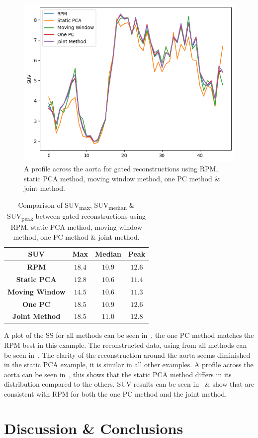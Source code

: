     \begin{figure}
        \centering
        \includegraphics[width=0.5\linewidth]{figures/profile_pca.png}
        \captionsetup{singlelinecheck=false, justification=centering}
        \caption{A profile across the aorta for gated reconstructions using \gls{RPM}, static \gls{PCA} method, moving window method, one \gls{PC} method \& joint method.}
        \label{fig:profile}
    \end{figure}
    
    \begin{table}
        \centering
        \captionsetup{singlelinecheck=false, justification=centering}
        \caption{Comparison of \gls{SUV}\textsubscript{max}, \gls{SUV}\textsubscript{median} \& \gls{SUV}\textsubscript{peak} between gated reconstructions using \gls{RPM}, static \gls{PCA} method, moving window method, one \gls{PC} method \& joint method.}
        
        \resizebox*{0.5\linewidth}{!}
        {
            \begin{tabular}{||c|ccc||}
                \hline
                \textbf{\gls{SUV}} & \textbf{Max} & \textbf{Median} & \textbf{Peak} \\
                \hline
                \textbf{\gls{RPM}}          & $18.4$ & $10.9$ & $12.6$ \\
                \hline
                \textbf{Static \gls{PCA}}   & $12.8$ & $10.6$ & $11.4$ \\
                \textbf{Moving Window}      & $14.5$ & $10.6$ & $11.3$ \\
                \textbf{One \gls{PC}}       & $18.5$ & $10.9$ & $12.6$ \\
                \textbf{Joint Method}       & $18.5$ & $11.0$ & $12.8$ \\
                \hline
            \end{tabular}
        }
        \label{tab:suv}
    \end{table}
    
    A plot of the \gls{SS} for all methods can be seen in~, the one \gls{PC} method matches the \gls{RPM} best in this example. The reconstructed data, using  from all methods can be seen in~. The clarity of the reconstruction around the aorta seems diminished in the static \gls{PCA} example, it is similar in all other examples. A profile across the aorta can be seen in~, this shows that the static \gls{PCA} method differs in its distribution compared to the others. \gls{SUV} results can be seen in~ \& show that  are consistent with \gls{RPM} for both the one \gls{PC} method and the joint method.
    
\section{Discussion \& Conclusions} \label{sec:discussion_and_conclusions}
    
